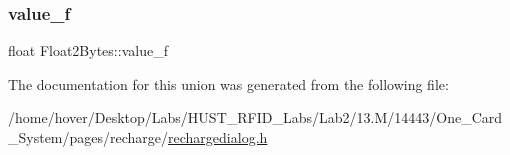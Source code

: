 \mbox{\label{union_float2_bytes_af2ad64a19825a68f71d1bff4fd320724}} 
\subsubsection{\texorpdfstring{value\_f}{value\_f}}
{\footnotesize\ttfamily float Float2\+Bytes\+::value\+\_\+f}



The documentation for this union was generated from the following file\+:\begin{DoxyCompactItemize}
\item 
/home/hover/\+Desktop/\+Labs/\+H\+U\+S\+T\+\_\+\+R\+F\+I\+D\+\_\+\+Labs/\+Lab2/13.\+M/14443/\+One\+\_\+\+Card\+\_\+\+System/pages/recharge/\mbox{\hyperlink{rechargedialog_8h}{rechargedialog.\+h}}\end{DoxyCompactItemize}
